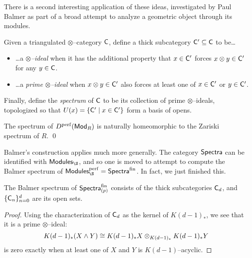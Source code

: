 There is a second interesting application of these ideas, investigated by Paul Balmer as part of a broad attempt to analyze a geometric object through its modules.

\begin{definition}
Given a triangulated $\otimes$--category $\mathsf{C}$, define a thick subcategory $\mathsf{C}' \subseteq \mathsf{C}$ to be\ldots
\begin{itemize}
\item \ldots a \textit{$\otimes$--ideal} when it has the additional property that $x \in \mathsf{C}'$ forces $x \otimes y \in \mathsf{C}'$ for any $y \in \mathsf{C}$.
\item \ldots a \textit{prime $\otimes$--ideal} when $x \otimes y \in \mathsf{C}'$ also forces at least one of $x \in \mathsf{C}'$ or $y \in \mathsf{C}'$.
\end{itemize}
Finally, define the \textit{spectrum} of $\mathsf{C}$ to be its collection of prime $\otimes$--ideals, topologized so that $U(x) = \{\mathsf{C}' \mid x \in \mathsf{C}'\}$ form a basis of opens.
\end{definition}

\begin{theorem}[Balmer]
The spectrum of $D^{\mathrm{perf}}(\mathsf{Mod}_R)$ is naturally homeomorphic to the Zariski spectrum of $R$. \qed
\end{theorem}

Balmer's construction applies much more generally.  The category $\mathsf{Spectra}$ can be identified with $\CatOf{Modules}_{\S}$, and so one is moved to attempt to compute the Balmer spectrum of $\CatOf{Modules}_{\S}^{\perf} = \CatOf{Spectra}^{\mathrm{fin}}$.  In fact, we just finished this.
\begin{theorem}
The Balmer spectrum of $\mathsf{Spectra}_{(p)}^{\mathrm{fin}}$ consists of the thick subcategories $\mathsf{C}_d$, and $\{\mathsf{C}_n\}_{n=0}^d$ are its open sets.
\end{theorem}
\begin{proof}
Using the characterization of $\mathsf{C}_d$ as the kernel of $K(d-1)_*$, we see that it is a prime $\otimes$--ideal: \[K(d-1)_*(X \wedge Y) \cong K(d-1)_* X \otimes_{K(d-1)_*} K(d-1)_* Y\] is zero exactly when at least one of $X$ and $Y$ is $K(d-1)$--acyclic.
\end{proof}

